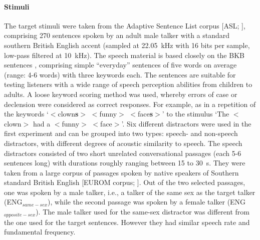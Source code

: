 \documentclass[a4paper, twoside]{templates/ociamthesis}
\begin{document}
\hypertarget{stimuli}{%
\paragraph{Stimuli}\label{stimuli}}

\hfill\break
The target stimuli were taken from the Adaptive Sentence List corpus {[}ASL; \textcite{MacLeod1990}{]}, comprising 270 sentences spoken by an adult male talker with a standard southern British English accent (sampled at 22.05~kHz with 16 bits per sample, low-pass filtered at 10~kHz). The speech material is based closely on the BKB sentences \autocite{Bench1979}, comprising simple ``everyday'' sentences of five words on average (range: 4-6 words) with three keywords each. The sentences are suitable for testing listeners with a wide range of speech perception abilities from children to adults. A loose keyword scoring method was used, whereby errors of case or declension were considered as correct responses. For example, as in a repetition of the keywords `\(<\)clown\textbf{s}\(>\) \(<\)funny\(>\) \(<\)face\textbf{s}\(>\)' to the stimulus `The \(<\)clown\(>\) had a \(<\)funny\(>\) \(<\)face\(>\)'. Six different distractors were used in the first experiment and can be grouped into two types: speech- and non-speech distractors, with different degrees of acoustic similarity to speech. The speech distractors consisted of two short unrelated conversational passages (each 5-6 sentences long) with durations roughly ranging between 15 to 30~s. They were taken from a large corpus of passages spoken by native speakers of Southern standard British English {[}EUROM corpus; \textcite{Chan1995}{]}. Out of the two selected passages, one was spoken by a male talker, i.e., a talker of the same sex as the target talker (ENG\(_{same-sex}\)), while the second passage was spoken by a female talker (ENG\(_{opposite-sex}\)). The male talker used for the same-sex distractor was different from the one used for the target sentences. However they had similar speech rate and fundamental frequency.\\
\end{document}
